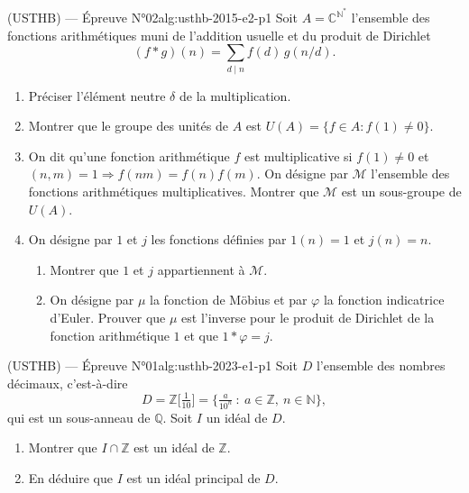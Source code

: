 \newpage

\begin{problem}{(USTHB) — Épreuve N°02}{alg:usthb-2015-e2-p1}
Soit $A = \mathbb{C}^{\mathbb{N}^*}$ l'ensemble des fonctions arithmétiques muni de
l'addition usuelle et du produit de Dirichlet
$$
(f*g)(n)=\sum_{d\mid n} f(d)\,g(n/d).
$$
\begin{enumerate}
\item Préciser l'élément neutre $\delta$ de la multiplication.
\item Montrer que le groupe des unités de $A$ est $U(A)=\{f\in A : f(1)\neq 0\}$.
\item On dit qu'une fonction arithmétique $f$ est multiplicative si $f(1)\neq 0$ et
      $(n,m)=1 \Rightarrow f(nm)=f(n)f(m)$. On désigne par $\mathcal{M}$ l'ensemble
      des fonctions arithmétiques multiplicatives. Montrer que $\mathcal{M}$ est un
      sous-groupe de $U(A)$.
\item On désigne par $1$ et $j$ les fonctions définies par $1(n)=1$ et $j(n)=n$.
      \begin{enumerate}
      \item Montrer que $1$ et $j$ appartiennent à $\mathcal{M}$.
      \item On désigne par $\mu$ la fonction de Möbius et par $\varphi$ la fonction
            indicatrice d'Euler. Prouver que $\mu$ est l'inverse pour le produit de
            Dirichlet de la fonction arithmétique $1$ et que $1*\varphi=j$.
      \end{enumerate}
\end{enumerate}

\end{problem}

\newpage

\begin{problem}{(USTHB) — Épreuve N°01}{alg:usthb-2023-e1-p1}
Soit $D$ l'ensemble des nombres décimaux, c'est-à-dire
$$
D=\mathbb{Z}\Big[\tfrac1{10}\Big]=\Big\{\tfrac{a}{10^n}\ :\ a\in\mathbb{Z},\ n\in\mathbb{N}\Big\},
$$
qui est un sous-anneau de $\mathbb{Q}$. Soit $I$ un idéal de $D$.
\begin{enumerate}
\item Montrer que $I\cap\mathbb{Z}$ est un idéal de $\mathbb{Z}$.
\item En déduire que $I$ est un idéal principal de $D$.
\end{enumerate}

\end{problem}

